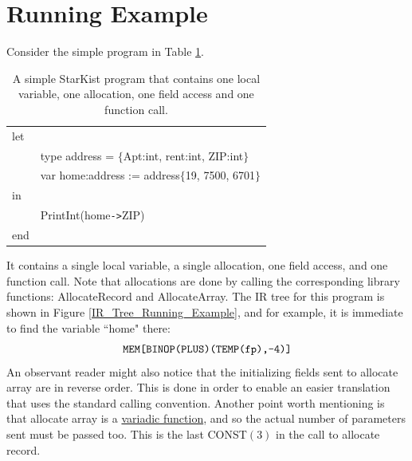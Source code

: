 \documentclass{article}
\begin{document}
\section{Running Example}
Consider the simple program in Table \ref{Table_StarKist_Program_Running_Example}.
\begin{table}[h]
\centering
\begin{tabular}{l l}
  let    &                                                   \\
         & type address = $\{$Apt:int, rent:int, ZIP:int$\}$ \\
         & var home:address := address$\{$19, 7500, 6701$\}$ \\
  in     &                                                   \\
         & PrintInt(home\verb"->"ZIP)                    \\
  end    &                                                   \\
\end{tabular}
\caption{
A simple StarKist program that contains one local variable,
one allocation, one field access and one function call.
\label{Table_StarKist_Program_Running_Example}}
\end{table}
It contains a single local variable, a single allocation,
one field access, and one function call.
Note that allocations are done by calling the corresponding
library functions: AllocateRecord and AllocateArray.
The IR tree for this program is shown in Figure \ref{IR_Tree_Running_Example},
and for example, it is immediate to find the variable ``home" there:
\[
\verb"MEM[BINOP(PLUS)(TEMP(fp),-4)]"
\]
An observant reader might also notice that the initializing
fields sent to allocate array are in reverse order.
This is done in order to enable an easier translation
that uses the standard calling convention.
Another point worth mentioning is that allocate array is a
\href{https://en.wikipedia.org/wiki/Variadic_function}{variadic function},
and so the actual number of parameters sent must be passed too.
This is the last CONST$(3)$ in the call to allocate record.
\end{document}
